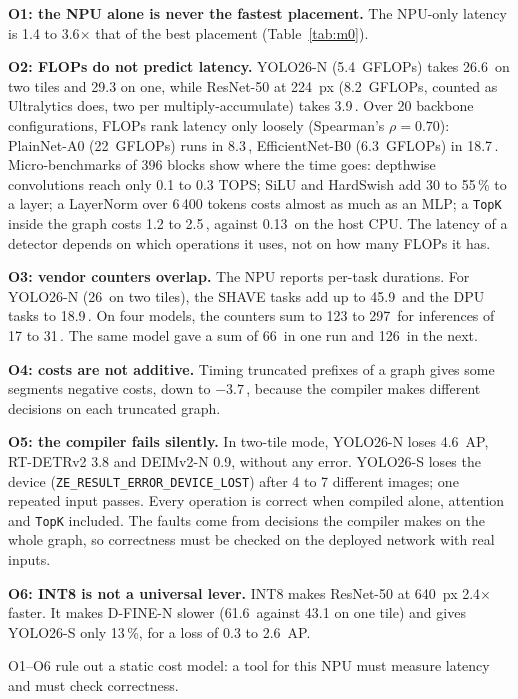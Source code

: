 \documentclass[conference]{IEEEtran}
\newcommand{\ms}{\,\text{ms}}
\begin{document}
\textbf{O1: the NPU alone is never the fastest placement.} The NPU-only latency is 1.4 to 3.6$\times$ that of the best placement (Table~\ref{tab:m0}).

\textbf{O2: FLOPs do not predict latency.} YOLO26-N (5.4~GFLOPs) takes 26.6\ms{} on two tiles and 29.3 on one, while ResNet-50 at 224~px (8.2~GFLOPs, counted as Ultralytics does, two per multiply-accumulate) takes 3.9\ms{}. Over 20 backbone configurations, FLOPs rank latency only loosely (Spearman's $\rho = 0.70$): PlainNet-A0 (22~GFLOPs) runs in 8.3\ms{}, EfficientNet-B0 (6.3~GFLOPs) in 18.7\ms{}. Micro-benchmarks of 396 blocks show where the time goes: depthwise convolutions reach only 0.1 to 0.3 TOPS; SiLU and HardSwish add 30 to 55\,\% to a layer; a LayerNorm over 6\,400 tokens costs almost as much as an MLP; a \texttt{TopK} inside the graph costs 1.2 to 2.5\ms{}, against 0.13\ms{} on the host CPU.
The latency of a detector depends on which operations it uses, not on how many FLOPs it has.

\textbf{O3: vendor counters overlap.} The NPU reports per-task durations. For YOLO26-N (26\ms{} on two tiles), the SHAVE tasks add up to 45.9\ms{} and the DPU tasks to 18.9\ms{}. On four models, the counters sum to 123 to 297\ms{} for inferences of 17 to 31\ms{}. The same model gave a sum of 66\ms{} in one run and 126\ms{} in the next.

\textbf{O4: costs are not additive.} Timing truncated prefixes of a graph gives some segments negative costs, down to $-3.7$\ms{}, because the compiler makes different decisions on each truncated graph.

\textbf{O5: the compiler fails silently.} In two-tile mode, YOLO26-N loses 4.6~AP, RT-DETRv2 3.8 and DEIMv2-N 0.9, without any error. YOLO26-S loses the device (\texttt{ZE\_RESULT\_ERROR\_DEVICE\_LOST}) after 4 to 7 different images; one repeated input passes. Every operation is correct when compiled alone, attention and \texttt{TopK} included. The faults come from decisions the compiler makes on the whole graph, so correctness must be checked on the deployed network with real inputs.

\textbf{O6: INT8 is not a universal lever.} INT8 makes ResNet-50 at 640~px 2.4$\times$ faster. It makes D-FINE-N slower (61.6\ms{} against 43.1 on one tile) and gives YOLO26-S only 13\,\%, for a loss of 0.3 to 2.6~AP.

O1--O6 rule out a static cost model: a tool for this NPU must measure latency and must check correctness.

\end{document}
